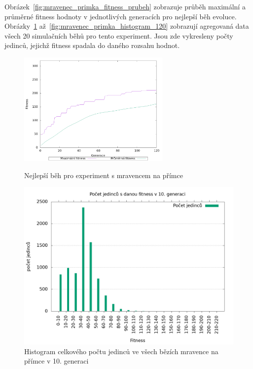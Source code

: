 Obrázek~\ref{fig:mravenec_primka_fitness_prubeh} zobrazuje průběh maximální a průměrné fitness hodnoty v jednotlivých generacích pro nejlepší běh evoluce.
Obrázky~\ref{fig:mravenec_primka_histogram_10} až~\ref{fig:mravenec_primka_histogram_120} zobrazují agregovaná data všech 20 simulačních běhů pro tento experiment.
Jsou zde vykresleny počty jedinců, jejichž fitness spadala do daného rozsahu hodnot.

\begin{figure}[h]
    \begin{minipage}[c]{0.48\linewidth}
    {\includegraphics[width=20em]{obrazky/mravenec_primka_fitness_prubeh.png}}
        \caption{
        Nejlepší běh pro experiment s mravencem na přímce
        }
        \label{fig:mravenec_primka_fitness_prubeh}

    \end{minipage}
    \hfill
    \begin{minipage}[c]{0.48\linewidth}
        \includegraphics[width=\linewidth]{obrazky/mravenec_primka_fitnessHistogram10.png}
        \caption{Histogram celkového počtu jedinců ve všech bězích mravence na přímce v 10. generaci}
        \label{fig:mravenec_primka_histogram_10}
    \end{minipage}
\end{figure}

